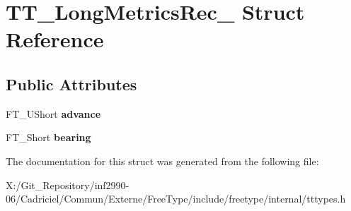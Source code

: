 \hypertarget{struct_t_t___long_metrics_rec__}{\section{T\-T\-\_\-\-Long\-Metrics\-Rec\-\_\- Struct Reference}
\label{struct_t_t___long_metrics_rec__}
}
\subsection*{Public Attributes}
\begin{DoxyCompactItemize}
\item 
\hypertarget{struct_t_t___long_metrics_rec___a47100e42b52486bc374f80ed2795361d}{F\-T\-\_\-\-U\-Short {\bfseries advance}}\label{struct_t_t___long_metrics_rec___a47100e42b52486bc374f80ed2795361d}

\item 
\hypertarget{struct_t_t___long_metrics_rec___a0d74e3eb8611b0a5e89e338af35be4da}{F\-T\-\_\-\-Short {\bfseries bearing}}\label{struct_t_t___long_metrics_rec___a0d74e3eb8611b0a5e89e338af35be4da}

\end{DoxyCompactItemize}


The documentation for this struct was generated from the following file\-:\begin{DoxyCompactItemize}
\item 
X\-:/\-Git\-\_\-\-Repository/inf2990-\/06/\-Cadriciel/\-Commun/\-Externe/\-Free\-Type/include/freetype/internal/tttypes.\-h\end{DoxyCompactItemize}
